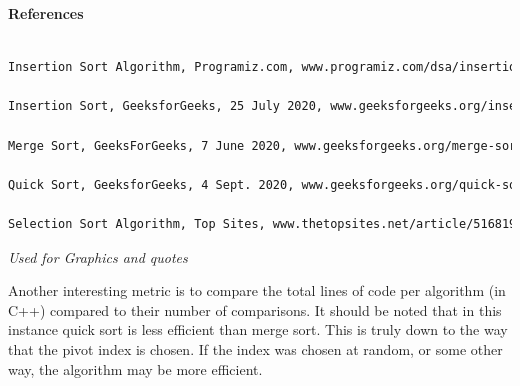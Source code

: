 \documentclass[letterpaper, 10pt]{article}
\begin{document}
\center\large\textbf{References}
\begin{small}

 \begin{lstlisting}[language=TeX]
 
Insertion Sort Algorithm, Programiz.com, www.programiz.com/dsa/insertion-sort. 

Insertion Sort, GeeksforGeeks, 25 July 2020, www.geeksforgeeks.org/insertion-sort/.

Merge Sort, GeeksForGeeks, 7 June 2020, www.geeksforgeeks.org/merge-sort/. 

Quick Sort, GeeksforGeeks, 4 Sept. 2020, www.geeksforgeeks.org/quick-sort/?ref=lbp. 

Selection Sort Algorithm, Top Sites, www.thetopsites.net/article/51681938.shtml. 
\end{lstlisting}

\textit{Used for Graphics and quotes}
\end{small}
\vspace{4em}

Another interesting metric is to compare the total lines of code per algorithm (in C++) compared to their number of comparisons. It should be noted that in this instance quick sort is less efficient than merge sort. This is truly down to the way that the pivot index is chosen. If the index was chosen at random, or some other way, the algorithm may be more efficient. 


\begin{center}
\end{center}
\end{document}

